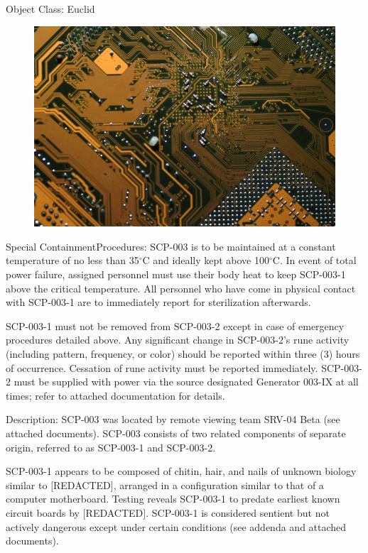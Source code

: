 \documentclass[a4paper, 11pt]{article}
\newcommand{\lb}{\ensuremath{[}}
\newcommand{\rb}{\ensuremath{]}}
\newcommand{\degree}{$^{\circ}$}
\newcommand{\redacted}{\lb REDACTED\rb}
\begin{document}
Object Class: Euclid

\begin{figure}
\includegraphics[scale=0.34]{img/scp/003.jpg}
\end{figure}

Special Containment\linebreak Procedures: SCP-003 is to be maintained at a constant temperature of no less than 35\degree C and ideally kept above 100\degree C. In event of total power failure, assigned personnel must use their body heat to keep SCP-003-1 above the critical temperature. All personnel who have come in physical contact with SCP-003-1 are to immediately report for sterilization afterwards.

SCP-003-1 must not be removed from SCP-003-2 except in case of emergency procedures detailed above. Any significant change in SCP-003-2's rune activity (including pattern, frequency, or color) should be reported within three (3) hours of occurrence. Cessation of rune activity must be reported immediately. SCP-003-2 must be supplied with power via the source designated Generator 003-IX at all times; refer to attached documentation for details.

Description: SCP-003 was located by remote viewing team SRV-04 Beta (see attached documents). SCP-003 consists of two related components of separate origin, referred to as SCP-003-1 and SCP-003-2.

SCP-003-1 appears to be composed of chitin, hair, and nails of unknown biology similar to \redacted, arranged in a configuration similar to that of a computer motherboard. Testing reveals SCP-003-1 to predate earliest known circuit boards by \redacted. SCP-003-1 is considered sentient but not actively dangerous except under certain conditions (see addenda and attached documents).
\end{document}
